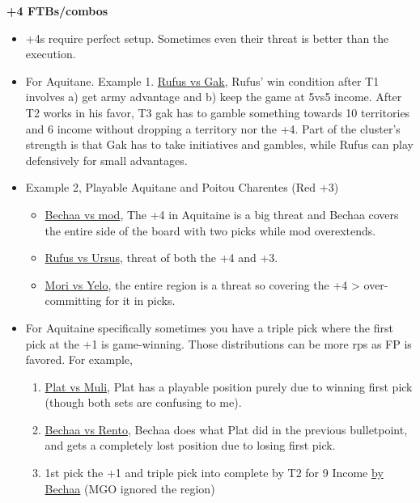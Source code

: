 \textbf{+4 FTBs/combos}

\begin{itemize}
    \item +4s require perfect setup. Sometimes even their threat is better than the execution.
    \item For Aquitane. Example 1. \href{https://www.warzone.com/MultiPlayer?GameID=28062679}{Rufus vs Gak}, Rufus' win condition after T1 involves a) get army advantage and b) keep the game at 5vs5 income. After T2 works in his favor, T3 gak has to gamble something towards 10 territories and 6 income without dropping a territory nor the +4. Part of the cluster's strength is that Gak has to take initiatives and gambles, while Rufus can play defensively for small advantages.
    \item Example 2, Playable Aquitane and Poitou Charentes (Red +3) 
    \begin{itemize}
        \item \href{https://www.warzone.com/MultiPlayer?GameID=26158910}{Bechaa vs mod}, The +4 in Aquitaine is a big threat and Bechaa covers the entire side of the board with two picks while mod overextends.
        \item \href{https://www.warzone.com/MultiPlayer?GameID=25460540}{Rufus vs Ursus}, threat of both the +4 and +3.
        \item \href{https://www.warzone.com/MultiPlayer?GameID=30110334}{Mori vs Yelo}, the entire region is a threat so covering the +4 > over-committing for it in picks.
    \end{itemize}
    \item For Aquitaine specifically sometimes you have a triple pick where the first pick at the +1 is game-winning. Those distributions can be more rps as FP is favored. For example, 
    \begin{enumerate}
        \item \href{https://www.warzone.com/MultiPlayer?GameID=24218428}{Plat vs Muli}, Plat has a playable position purely due to winning first pick (though both sets are confusing to me).
        \item \href{https://www.warzone.com/MultiPlayer?GameID=27625748}{Bechaa vs Rento}, Bechaa does what Plat did in the previous bulletpoint, and gets a completely lost position due to losing first pick.
        \item  1st pick the +1 and triple pick into complete by T2 for 9 Income \href{https://www.warzone.com/MultiPlayer?GameID=26081143}{by Bechaa} (MGO ignored the region)

\end{enumerate}
\end{itemize}
